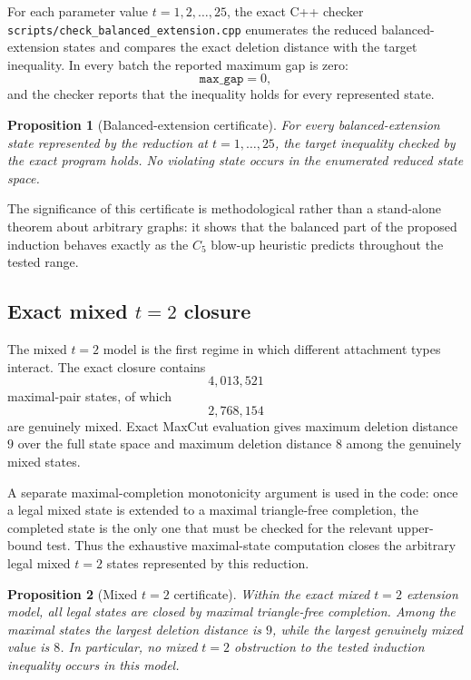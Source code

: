 \documentclass[11pt]{article}
\newtheorem{proposition}{Proposition}
\begin{document}
For each parameter value $t=1,2,\ldots,25$, the exact C++ checker
\texttt{scripts/check\_balanced\_extension.cpp} enumerates the reduced
balanced-extension states and compares the exact deletion distance with
the target inequality.  In every batch the reported maximum gap is zero:
\[
\texttt{max\_gap}=0,
\]
and the checker reports that the inequality holds for every represented
state.

\begin{proposition}[Balanced-extension certificate]
For every balanced-extension state represented by the reduction at
$t=1,\ldots,25$, the target inequality checked by the exact program holds.
No violating state occurs in the enumerated reduced state space.
\end{proposition}

The significance of this certificate is methodological rather than a
stand-alone theorem about arbitrary graphs: it shows that the balanced
part of the proposed induction behaves exactly as the $C_5$ blow-up
heuristic predicts throughout the tested range.

\subsection{Exact mixed $t=2$ closure}

The mixed $t=2$ model is the first regime in which different attachment
types interact.  The exact closure contains
\[
4{,}013{,}521
\]
maximal-pair states, of which
\[
2{,}768{,}154
\]
are genuinely mixed.  Exact MaxCut evaluation gives maximum deletion
distance $9$ over the full state space and maximum deletion distance $8$
among the genuinely mixed states.

A separate maximal-completion monotonicity argument is used in the code:
once a legal mixed state is extended to a maximal triangle-free completion,
the completed state is the only one that must be checked for the relevant
upper-bound test.  Thus the exhaustive maximal-state computation closes
the arbitrary legal mixed $t=2$ states represented by this reduction.

\begin{proposition}[Mixed $t=2$ certificate]
Within the exact mixed $t=2$ extension model, all legal states are closed
by maximal triangle-free completion.  Among the maximal states the largest
deletion distance is $9$, while the largest genuinely mixed value is $8$.
In particular, no mixed $t=2$ obstruction to the tested induction
inequality occurs in this model.
\end{proposition}
\end{document}

